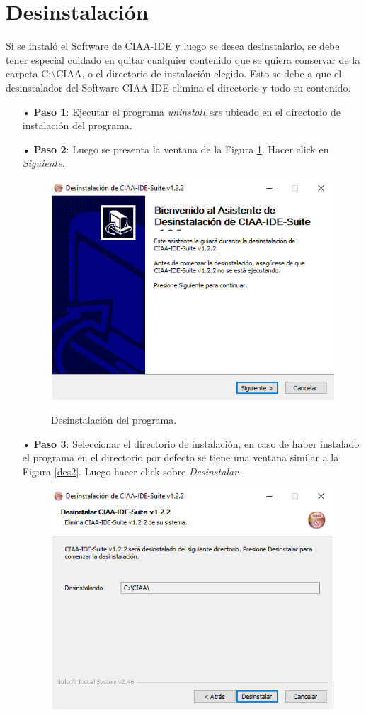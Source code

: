 \documentclass[12pt,letterpaper]{article}
\begin{document}
\section{Desinstalación}
Si se instaló el Software de CIAA-IDE y luego se desea desinstalarlo, se debe tener especial
cuidado en quitar cualquier contenido que se quiera conservar de la carpeta C:$\setminus$CIAA, o el directorio de instalación elegido. Esto se debe a que el desinstalador del Software CIAA-IDE elimina el directorio y todo su contenido.
\begin{enumerate}
\item[•]\textbf{Paso 1}: Ejecutar el programa \textit{uninstall.exe} ubicado en el directorio de instalación del programa.
\item[•]\textbf{Paso 2}: Luego se presenta la ventana de la Figura \ref{des1}. Hacer click en \textit{Siguiente}.
\begin{figure}[H]
\centering
\includegraphics[width=8 cm]{figuras/des1.png}\\
\caption{Desinstalación del programa.}
\label{des1}
\end{figure}
\item[•]\textbf{Paso 3}: Seleccionar el directorio de instalación, en caso de haber instalado el programa en el directorio por defecto se tiene una ventana similar a la Figura \ref{des2}. Luego hacer click sobre \textit{Desinstalar}.
\begin{figure}[H]
\centering
\includegraphics[width=8 cm]{figuras/des2.png}\\

\end{figure}
\end{enumerate}
\end{document}
